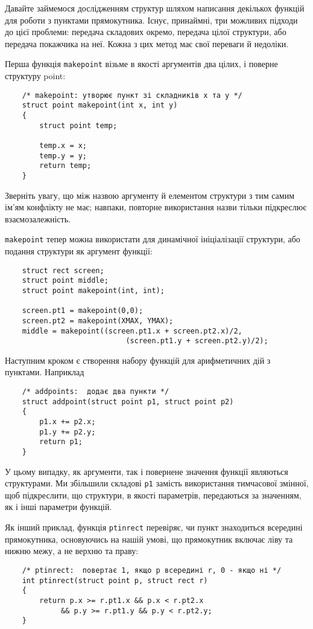 \documentclass[a4paper,12pt]{book}
\begin{document}
  Давайте займемося дослідженням структур шляхом написання декількох функцій для роботи з
  пунктами прямокутника. Існує, принаймні, три можливих підходи до цієї проблеми: передача
  складових окремо, передача цілої структури, або передача покажчика на неї. Кожна з цих
  метод має свої переваги й недоліки.

  Перша функція \texttt{makepoint} візьме в якості аргументів два цілих, і поверне
  структуру point:
  \begin{verbatim}
    /* makepoint: утворює пункт зі складників x та y */
    struct point makepoint(int x, int y)
    {
        struct point temp;

        temp.x = x;
        temp.y = y;
        return temp;
    }
  \end{verbatim}

  Зверніть увагу, що між назвою аргументу й елементом структури з тим самим ім'ям
  конфлікту не має; навпаки, повторне використання назви тільки підкреслює
  взаємозалежність.

  \texttt{makepoint} тепер можна використати для динамічної ініціалізації структури, або
  подання структури як аргумент функції:
  \begin{verbatim}
    struct rect screen;
    struct point middle;
    struct point makepoint(int, int);

    screen.pt1 = makepoint(0,0);
    screen.pt2 = makepoint(XMAX, YMAX);
    middle = makepoint((screen.pt1.x + screen.pt2.x)/2,
                            (screen.pt1.y + screen.pt2.y)/2);
  \end{verbatim}

  Наступним кроком є створення набору функцій для арифметичних дій з пунктами.
  Наприклад
  \begin{verbatim}
    /* addpoints:  додає два пункти */
    struct addpoint(struct point p1, struct point p2)
    {
        p1.x += p2.x;
        p1.y += p2.y;
        return p1;
    }
  \end{verbatim}

  У цьому випадку, як аргументи, так і повернене значення функції являються структурами.
  Ми збільшили складові \texttt{p1} замість використання тимчасової змінної, щоб
  підкреслити, що структури, в якості параметрів, передаються за значенням, як і інші
  параметри функцій.

  Як інший приклад, функція \texttt{ptinrect} перевіряє, чи пункт знаходиться всередині
  прямокутника, основуючись на нашій умові, що прямокутник включає ліву та нижню межу, а
  не верхню та праву:
  \begin{verbatim}
    /* ptinrect:  повертає 1, якщо p всередині r, 0 - якщо ні */
    int ptinrect(struct point p, struct rect r)
    {
        return p.x >= r.pt1.x && p.x < r.pt2.x
             && p.y >= r.pt1.y && p.y < r.pt2.y;
    }
  \end{verbatim}
\end{document}
